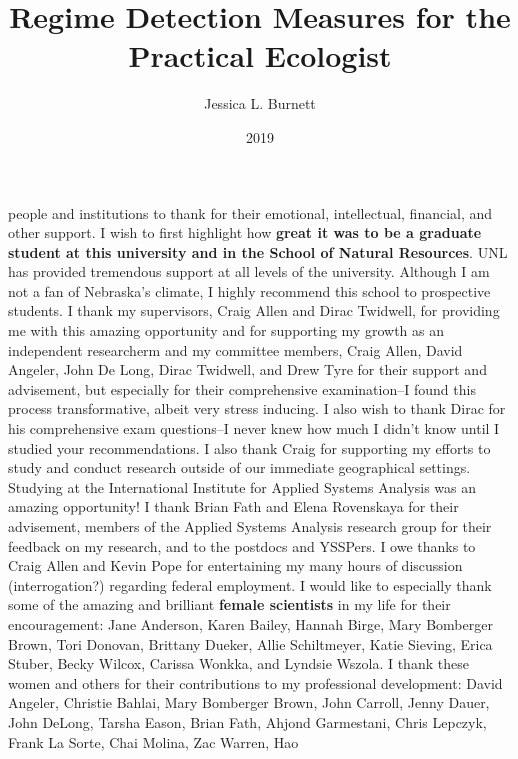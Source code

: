 \documentclass[12pt,twoside,openany]{reedthesis}
\title{Regime Detection Measures for the Practical Ecologist}
\author{Jessica L. Burnett}
\date{2019}
\begin{document}
  \maketitle

\frontmatter %
\pagestyle{empty} %

people and institutions to thank for their emotional, intellectual,
financial, and other support. I wish to first highlight how
\textbf{great it was to be a graduate student at this university and in
the School of Natural Resources}. UNL has provided tremendous support at
all levels of the university. Although I am not a fan of Nebraska's
climate, I highly recommend this school to prospective students. I thank
my supervisors, Craig Allen and Dirac Twidwell, for providing me with
this amazing opportunity and for supporting my growth as an independent
researcherm and my committee members, Craig Allen, David Angeler, John
De Long, Dirac Twidwell, and Drew Tyre for their support and advisement,
but especially for their comprehensive examination--I found this process
transformative, albeit very stress inducing. I also wish to thank Dirac
for his comprehensive exam questions--I never knew how much I didn't
know until I studied your recommendations. I also thank Craig for
supporting my efforts to study and conduct research outside of our
immediate geographical settings. Studying at the International Institute
for Applied Systems Analysis was an amazing opportunity! I thank Brian
Fath and Elena Rovenskaya for their advisement, members of the Applied
Systems Analysis research group for their feedback on my research, and
to the postdocs and YSSPers. I owe thanks to Craig Allen and Kevin Pope
for entertaining my many hours of discussion (interrogation?) regarding
federal employment. I would like to especially thank some of the amazing
and brilliant \textbf{female scientists} in my life for their
encouragement: Jane Anderson, Karen Bailey, Hannah Birge, Mary Bomberger
Brown, Tori Donovan, Brittany Dueker, Allie Schiltmeyer, Katie Sieving,
Erica Stuber, Becky Wilcox, Carissa Wonkka, and Lyndsie Wszola. I thank
these women and others for their contributions to my professional
development: David Angeler, Christie Bahlai, Mary Bomberger Brown, John
Carroll, Jenny Dauer, John DeLong, Tarsha Eason, Brian Fath, Ahjond
Garmestani, Chris Lepczyk, Frank La Sorte, Chai Molina, Zac Warren, Hao
\end{document}
